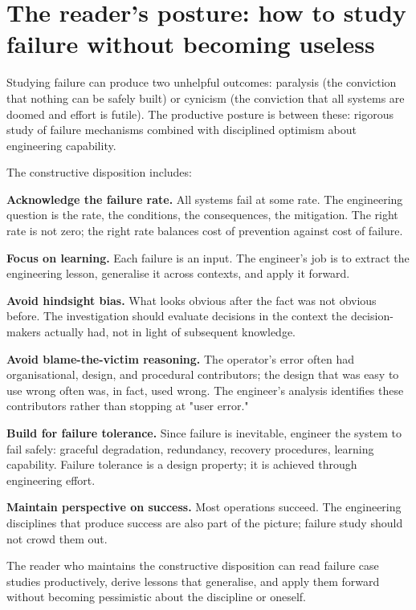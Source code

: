 \section{The reader's posture: how to study failure without becoming useless}

Studying failure can produce two unhelpful outcomes: paralysis (the conviction that nothing can be safely built) or cynicism (the conviction that all systems are doomed and effort is futile). The productive posture is between these: rigorous study of failure mechanisms combined with disciplined optimism about engineering capability.

The constructive disposition includes:

\textbf{Acknowledge the failure rate.} All systems fail at some rate. The engineering question is the rate, the conditions, the consequences, the mitigation. The right rate is not zero; the right rate balances cost of prevention against cost of failure.

\textbf{Focus on learning.} Each failure is an input. The engineer's job is to extract the engineering lesson, generalise it across contexts, and apply it forward.

\textbf{Avoid hindsight bias.} What looks obvious after the fact was not obvious before. The investigation should evaluate decisions in the context the decision-makers actually had, not in light of subsequent knowledge.

\textbf{Avoid blame-the-victim reasoning.} The operator's error often had organisational, design, and procedural contributors; the design that was easy to use wrong often was, in fact, used wrong. The engineer's analysis identifies these contributors rather than stopping at "user error."

\textbf{Build for failure tolerance.} Since failure is inevitable, engineer the system to fail safely: graceful degradation, redundancy, recovery procedures, learning capability. Failure tolerance is a design property; it is achieved through engineering effort.

\textbf{Maintain perspective on success.} Most operations succeed. The engineering disciplines that produce success are also part of the picture; failure study should not crowd them out.

The reader who maintains the constructive disposition can read failure case studies productively, derive lessons that generalise, and apply them forward without becoming pessimistic about the discipline or oneself.


